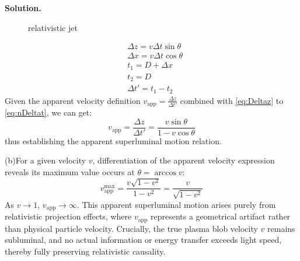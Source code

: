 \documentclass[12pt, a4paper, oneside]{article}
\newenvironment{solution}{\par\noindent\textbf{Solution. }}{\par}
\begin{document}
\begin{solution}
\begin{figure}[htbp]
        \caption{relativistic jet}
        \label{fig:jet}
      \end{figure}

      \begin{align}
        &\Delta z = v\Delta t\sin\theta\label{eq:Deltaz}\\
        &\Delta x = v\Delta t\cos\theta\label{eq:Deltax}\\
        &t_1 = D+\Delta x\label{eq:t1}\\
        &t_2 = D\label{eq:t2}\\
        &\Delta t' = t_1 - t_2\label{eq:nDeltat}
      \end{align}
      Given the apparent velocity definition $v_\text{app}=\frac{\Delta z}{\Delta t'}$ combined with \cref{eq:Deltaz} to \cref{eq:nDeltat}, we can get:
      \begin{equation}
        v_\text{app}=\frac{\Delta z}{\Delta t'}=\frac{v\sin\theta}{1-v\cos\theta}
      \end{equation}
      thus establishing the apparent superluminal motion relation.

      (b)For a given velocity $v$, differentiation of the apparent velocity expression reveals its maximum value occurs at $\theta=\arccos v$:
      \begin{equation}
        v_\text{app}^\text{max}=\frac{v\sqrt{1-v^2}}{1-v^2}=\frac{v}{\sqrt{1-v^2}}
      \end{equation}
      As $v\to 1$, $v_\text{app}\to\infty$. This apparent superluminal motion arises purely from relativistic projection effects, where $v_\text{app}$ represents a geometrical artifact rather than physical particle velocity. Crucially, the true plasma blob velocity $v$ remains subluminal, and no actual information or energy transfer exceeds light speed, thereby fully preserving relativistic causality.


\end{solution}
\end{document}
